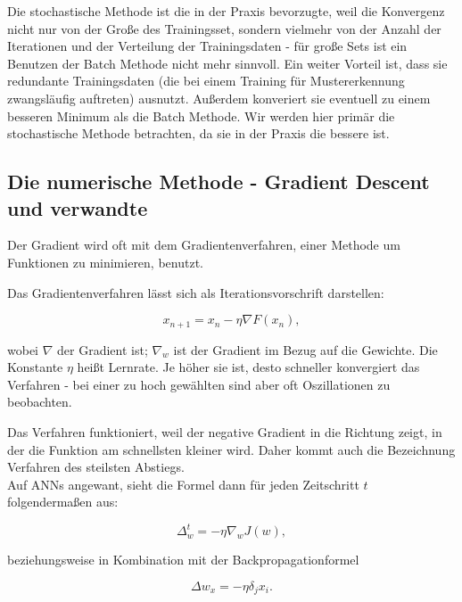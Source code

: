 Die stochastische Methode ist die in der Praxis bevorzugte, weil die Konvergenz nicht nur von der Große des Trainingsset, sondern vielmehr von der Anzahl der Iterationen und der Verteilung der Trainingsdaten - für große Sets ist ein Benutzen der Batch Methode nicht mehr sinnvoll. \cite{bengio2012practical}
Ein weiter Vorteil ist, dass sie redundante Trainingsdaten (die bei einem Training für Mustererkennung zwangsläufig auftreten) ausnutzt. Außerdem konveriert sie eventuell zu einem besseren Minimum als die Batch Methode. \cite{lecunefficient}
Wir werden hier primär die stochastische Methode betrachten, da sie in der Praxis die bessere ist. \cite{lecunefficient, bengio2012practical}


\subsection{Die numerische Methode - Gradient Descent und verwandte}

Der Gradient wird oft mit dem Gradientenverfahren, einer Methode um Funktionen zu minimieren, benutzt.

Das Gradientenverfahren lässt sich als Iterationsvorschrift darstellen:

\begin{equation}
x_{n+1}=x_n- \eta  \nabla F(x_n), 
\end{equation}

wobei $\nabla$ der Gradient ist; $\nabla_w$ ist der Gradient im Bezug auf die Gewichte. 
Die Konstante $\eta$ heißt Lernrate. Je höher sie ist, desto schneller konvergiert das Verfahren - bei einer zu hoch gewählten sind aber oft Oszillationen zu beobachten. 

Das Verfahren funktioniert, weil der negative Gradient in die Richtung zeigt, in der die Funktion am schnellsten kleiner wird. Daher kommt auch die Bezeichnung Verfahren des steilsten Abstiegs.\\


Auf ANNs angewant, sieht die Formel dann für jeden Zeitschritt $t$ folgendermaßen aus:

\begin{equation}
  \Delta_w^t = - \eta  \nabla_w J(w),
\end{equation}

beziehungsweise in Kombination mit der Backpropagationformel

\begin{equation}
\Delta w_x = - \eta  \delta_j  x_i.
\end{equation}

